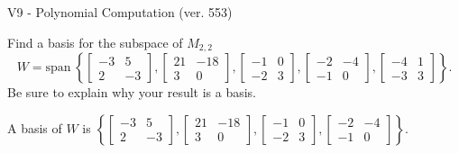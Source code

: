 \begin{exercise}
  \begin{exerciseTitle}V9 - Polynomial Computation (ver. 553)\end{exerciseTitle}
  \begin{exerciseStatement}
    Find a basis for the subspace of \(M_{2,2}\) 
\[W=\mathrm{span}\ \left\{\left[\begin{array}{cc}
-3 & 5 \\
2 & -3
\end{array}\right] , \left[\begin{array}{cc}
21 & -18 \\
3 & 0
\end{array}\right] , \left[\begin{array}{cc}
-1 & 0 \\
-2 & 3
\end{array}\right] , \left[\begin{array}{cc}
-2 & -4 \\
-1 & 0
\end{array}\right] , \left[\begin{array}{cc}
-4 & 1 \\
-3 & 3
\end{array}\right]\right\}.\]
 Be sure to explain why your result is a basis.


  \end{exerciseStatement}
  \begin{exerciseAnswer}
   A basis of \(W\) is  \(\left\{\left[\begin{array}{cc}
-3 & 5 \\
2 & -3
\end{array}\right] , \left[\begin{array}{cc}
21 & -18 \\
3 & 0
\end{array}\right] , \left[\begin{array}{cc}
-1 & 0 \\
-2 & 3
\end{array}\right] , \left[\begin{array}{cc}
-2 & -4 \\
-1 & 0
\end{array}\right]\right\}\).
  


  \end{exerciseAnswer}
\end{exercise}